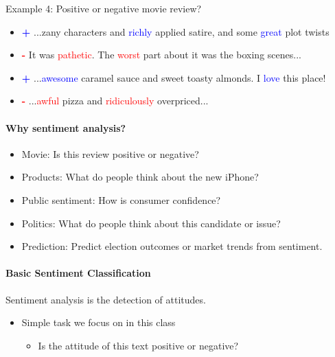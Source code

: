 Example 4: Positive or negative movie review?
    \begin{itemize}
     \item  \textcolor{blue}{\textbf{+}}   ...zany characters and \textcolor{blue}{richly} applied satire, and some \textcolor{blue}{great} plot twists 
     \item   \textcolor{red}{\textbf{-}} It was \textcolor{red}{pathetic}. The \textcolor{red}{worst} part about it was the boxing scenes... 
    \item   \textcolor{blue}{\textbf{+}}  ...\textcolor{blue}{awesome} caramel sauce and sweet toasty almonds. I \textcolor{blue}{love} this place! \\
     \item \textcolor{red}{\textbf{-}} ...\textcolor{red}{awful} pizza and \textcolor{red}{ridiculously} overpriced... 
    \end{itemize}



\paragraph{Why sentiment analysis?}
    \begin{itemize}
        \item Movie: Is this review positive or negative?
        \item Products: What do people think about the new iPhone?
        \item Public sentiment: How is consumer confidence?
        \item Politics: What do people think about this candidate or issue?
        \item Prediction: Predict election outcomes or market trends from sentiment.
    \end{itemize}


\paragraph{Basic Sentiment Classification}
    Sentiment analysis is the detection of attitudes.
    \begin{itemize}
        \item Simple task we focus on in this class
        \begin{itemize}
            \item Is the attitude of this text positive or negative?
        \end{itemize}
    \end{itemize}



